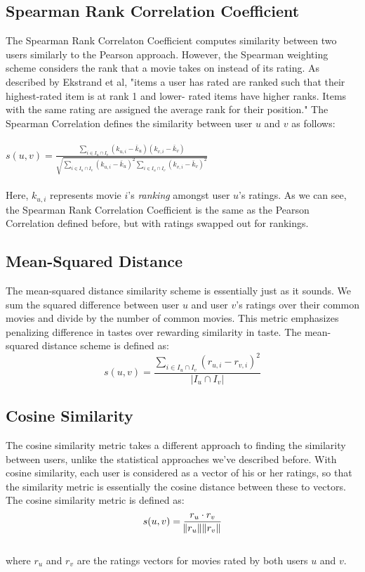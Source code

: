 \documentclass[11pt,letterpaper]{article}
\begin{document}
\subsection{Spearman Rank Correlation Coefficient}
The Spearman Rank Correlaton Coefficient computes similarity between two users similarly to the Pearson approach. However, the Spearman weighting scheme considers the rank that a movie takes on instead of its rating. As described by Ekstrand et al, "items a user has rated are ranked such that their highest-rated item is at rank 1 and lower- rated items have higher ranks. Items with the same rating are assigned the average rank for their position." The Spearman Correlation defines the similarity between user $u$ and $v$ as follows:\\\\
$s(u,v) = \frac{\sum_{i \in I_{u} \cap I_{v}} (k_{u, i} - \bar k_{u}) (k_{v, i} - \bar k_{v})}{\sqrt{\sum_{i \in I_{u} \cap I_{v}}(k_{u, i} - \bar k_{u})^2 \sum_{i \in I_{u} \cap I_{v}}(k_{v, i} - \bar k_{v})^2}} $\\
\\Here, $k_{u,i}$ represents movie $i$'s \textit{ranking} amongst user $u$'s ratings. As we can see, the Spearman Rank Correlation Coefficient is the same as the Pearson Correlation defined before, but with ratings swapped out for rankings.
\subsection{Mean-Squared Distance}
The mean-squared distance similarity scheme is essentially just as it sounds. We sum the squared difference between user $u$ and user $v$'s ratings over their common movies and divide by the number of common movies. This metric emphasizes penalizing difference in tastes over rewarding similarity in taste. The mean-squared distance scheme is defined as:
$$s(u,v) = \frac{\sum_{i \in I_{u} \cap I_{v}} (r_{u, i} - r_{v,i})^2}{|I_{u} \cap I_{v}|}$$
\subsection{Cosine Similarity}
The cosine similarity metric takes a different approach to finding the similarity between users, unlike the statistical approaches we've described before. With cosine similarity, each user is considered as a vector of his or her ratings, so that the similarity metric is essentially the cosine distance between these to vectors. The cosine similarity metric is defined as:
$$s(u,v) = \frac{r_u \cdot r_v}{\norm{r_u}\norm{r_v}}$$
\\where $r_u$ and $r_v$ are the ratings vectors for movies rated by both users $u$ and $v$.
\end{document}

